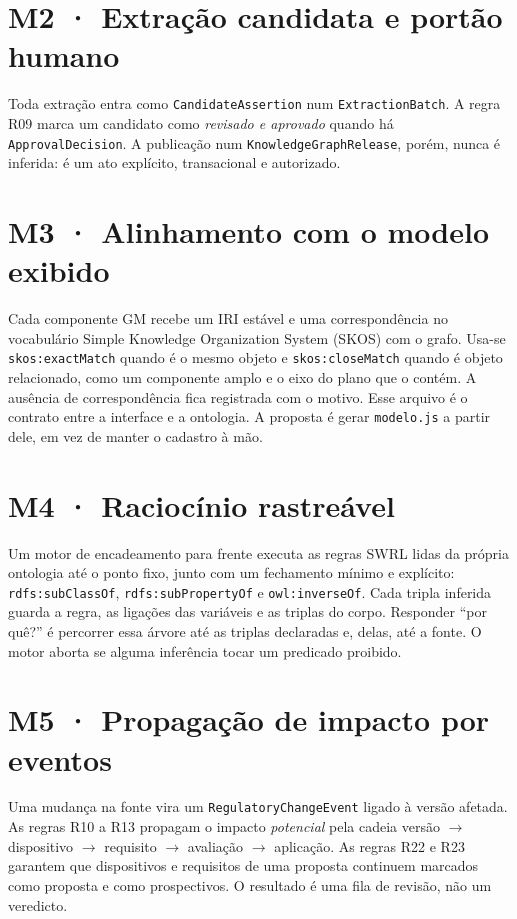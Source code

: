 \documentclass[12pt,a4paper,oneside,english,brazil]{abntex2}
\begin{document}
\section*{M2 · Extração candidata e portão humano}
Toda extração entra como \texttt{CandidateAssertion} num \texttt{ExtractionBatch}. A regra R09 marca um candidato como \emph{revisado e aprovado} quando há \texttt{ApprovalDecision}. A publicação num \texttt{KnowledgeGraphRelease}, porém, nunca é inferida: é um ato explícito, transacional e autorizado.

\section*{M3 · Alinhamento com o modelo exibido}
Cada componente GM recebe um IRI estável e uma correspondência no vocabulário Simple Knowledge Organization System (SKOS) \cite{w3c-skos} com o grafo. Usa-se \texttt{skos:exactMatch} quando é o mesmo objeto e \texttt{skos:closeMatch} quando é objeto relacionado, como um componente amplo e o eixo do plano que o contém. A ausência de correspondência fica registrada com o motivo. Esse arquivo é o contrato entre a interface e a ontologia. A proposta é gerar \texttt{modelo.js} a partir dele, em vez de manter o cadastro à mão.

\section*{M4 · Raciocínio rastreável}
Um motor de encadeamento para frente executa as regras SWRL lidas da própria ontologia até o ponto fixo, junto com um fechamento mínimo e explícito: \texttt{rdfs:subClassOf}, \texttt{rdfs:subPropertyOf} e \texttt{owl:inverseOf}. Cada tripla inferida guarda a regra, as ligações das variáveis e as triplas do corpo. Responder ``por quê?'' é percorrer essa árvore até as triplas declaradas e, delas, até a fonte. O motor aborta se alguma inferência tocar um predicado proibido.

\section*{M5 · Propagação de impacto por eventos}
Uma mudança na fonte vira um \texttt{RegulatoryChangeEvent} ligado à versão afetada. As regras R10 a R13 propagam o impacto \emph{potencial} pela cadeia versão $\to$ dispositivo $\to$ requisito $\to$ avaliação $\to$ aplicação. As regras R22 e R23 garantem que dispositivos e requisitos de uma proposta continuem marcados como proposta e como prospectivos. O resultado é uma fila de revisão, não um veredicto.
\end{document}
